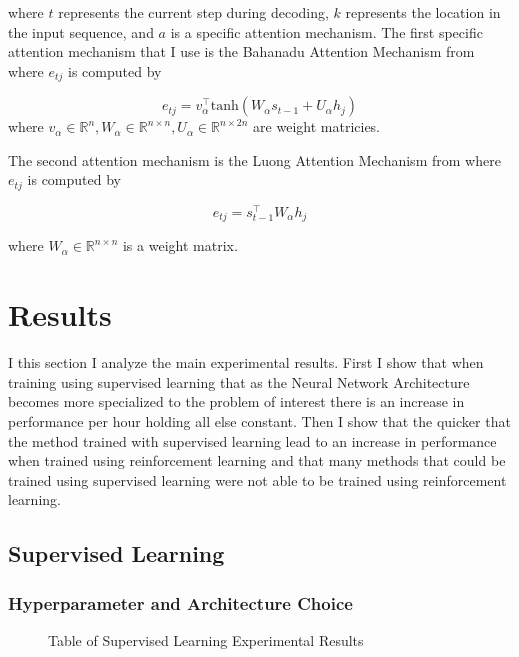 \documentclass[12pt]{article}
\begin{document}
where $t$ represents the current step during decoding, $k$ represents the location in the input sequence, and $a$ is a specific attention mechanism. The first specific attention mechanism that I use is the Bahanadu Attention Mechanism from \citet{2014_bah} where $e_{tj}$ is computed by

\begin{equation*}
  e_{tj}=v_\alpha^\top\text{tanh}(W_\alpha s_{t-1}+U_\alpha h_j)
\end{equation*}
where $v_\alpha \in \mathbb{R}^n, W_\alpha \in \mathbb{R}^{n \times n},U_\alpha \in \mathbb{R}^{n \times 2n}$ are weight matricies.

The second attention mechanism is the Luong Attention Mechanism from \citet{2015_luong} where $e_{tj}$ is computed by

\begin{equation*}
  e_{tj}= s_{t-1}^\top W_\alpha h_j
\end{equation*}

where $W_\alpha \in \mathbb{R}^{n \times n}$ is a weight matrix.



\section{Results}

I this section I analyze the main experimental results. First I show that when training using supervised learning that as the Neural Network Architecture becomes more specialized to the problem of interest there is an increase in performance per hour holding all else constant. Then I show that the quicker that the method trained with supervised learning lead to an increase in performance when trained using reinforcement learning and that many methods that could be trained using supervised learning were not able to be trained using reinforcement learning.

\subsection{Supervised Learning}

\subsubsection{Hyperparameter and Architecture Choice}

\begin{figure}[H]
  \centering
  \caption{Table of Supervised Learning Experimental Results}
  \label{fig_sl_table}
\end{figure}
\end{document}
